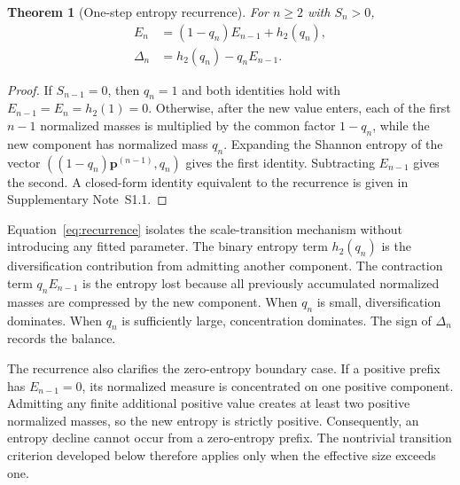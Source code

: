 \documentclass[aip,cha,reprint,superscriptaddress,floatfix]{revtex4-2}
\newtheorem{theorem}{Theorem}
\theoremstyle{definition}
\theoremstyle{remark}
\begin{document}
\begin{theorem}[One-step entropy recurrence]
\label{thm:recurrence}
For \(n\ge2\) with \(S_n>0\),
\begin{equation}
\begin{aligned}
E_n
&=(1-q_n)E_{n-1}+h_2(q_n),\\
\Delta_n
&=h_2(q_n)-q_nE_{n-1}.
\end{aligned}
\label{eq:recurrence}
\end{equation}
\end{theorem}
\begin{proof}
If \(S_{n-1}=0\), then \(q_n=1\) and both identities hold with \(E_{n-1}=E_n=h_2(1)=0\). Otherwise, after the new value enters, each of the first \(n-1\) normalized masses is multiplied by the common factor \(1-q_n\), while the new component has normalized mass \(q_n\). Expanding the Shannon entropy of the vector \(((1-q_n)\bm p^{(n-1)},q_n)\) gives the first identity. Subtracting \(E_{n-1}\) gives the second. A closed-form identity equivalent to the recurrence is given in Supplementary Note~S1.1.
\end{proof}

Equation~\eqref{eq:recurrence} isolates the scale-transition mechanism without introducing any fitted parameter. The binary entropy term \(h_2(q_n)\) is the diversification contribution from admitting another component. The contraction term \(q_nE_{n-1}\) is the entropy lost because all previously accumulated normalized masses are compressed by the new component. When \(q_n\) is small, diversification dominates. When \(q_n\) is sufficiently large, concentration dominates. The sign of \(\Delta_n\) records the balance.

The recurrence also clarifies the zero-entropy boundary case. If a positive prefix has \(E_{n-1}=0\), its normalized measure is concentrated on one positive component. Admitting any finite additional positive value creates at least two positive normalized masses, so the new entropy is strictly positive. Consequently, an entropy decline cannot occur from a zero-entropy prefix. The nontrivial transition criterion developed below therefore applies only when the effective size exceeds one.
\end{document}
